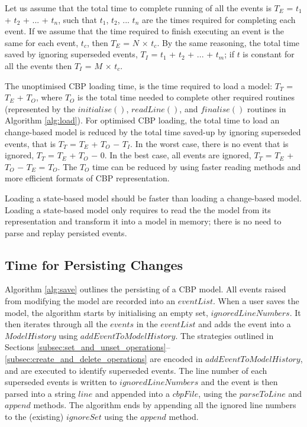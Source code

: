 \documentclass{llncs}
\begin{document}
    Let us assume that the total time to complete running of all the events is $T_E$ = $t_1$ + $t_2$ + ... + $t_n$, such that $t_1$, $t_2$, ... $t_n$ are the times required for completing each event. If we assume that the time required to finish executing an event is the same for each event, $t_c$, then $T_E$ = $N$ $\times$ $t_c$.  By the same reasoning, the total time saved by ignoring superseded events,  $T_I$ = $t_1$ + $t_2$ + ... + $t_m$; if $t$ is constant for all the events then $T_I$ = $M$ $\times$ $t_c$.
    
    The unoptimised CBP loading time, is the time required to load a model: $T_T$ = $T_E$ + $T_O$, where $T_O$ is the total time needed to complete other required routines (represented by the $initialise()$, $readLine()$, and $finalise()$ routines in Algorithm \ref{alg:load}). For optimised CBP loading, the total time to load an change-based model is reduced by the total time saved-up by ignoring superseded events, that is $T_T$ = $T_E$ + $T_O$ $-$ $T_I$. In the worst case, there is no event that is ignored, $T_T$ = $T_E$ + $T_O$ $-$ 0. In the best case, all events are ignored, $T_T$ = $T_E$ + $T_O$ $-$ $T_E$ = $T_O$. The $T_O$ time can be reduced by using faster reading methods and more efficient formats of CBP representation. 
    
    Loading a state-based model should be faster than loading a change-based model. Loading a state-based model only requires to read the the model from its representation and transform it into a model in memory; there is no need to parse and replay persisted events.
    
    \subsection{Time for Persisting Changes}
    Algorithm \ref{alg:save} outlines the persisting of a CBP model. All events raised from modifying the model are recorded into an $eventList$. When a user saves the model, the algorithm starts by initialising an empty set, $ignoredLineNumbers$. It then iterates through all the $events$ in the $eventList$ and adds the event into a $ModelHistory$ using $addEventToModelHistory$.  The strategies outlined in Sections \ref{subsec:set_and_unset_operations}--\ref{subsec:create_and_delete_operations} are encoded in  $addEventToModelHistory$, and are executed to identify superseded events. The line number of each superseded events is written to  $ignoredLineNumbers$ and the event is then parsed into a string $line$ and appended into a $cbpFile$, using the $parseToLine$ and $append$ methods. The algorithm ends by appending all the ignored line numbers to the (existing) $ignoreSet$ using the $append$ method.
    
\end{document}
